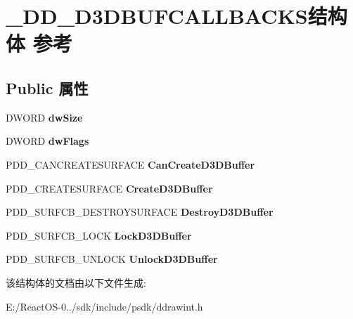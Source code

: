 \hypertarget{struct___d_d___d3_d_b_u_f_c_a_l_l_b_a_c_k_s}{}\section{\+\_\+\+D\+D\+\_\+\+D3\+D\+B\+U\+F\+C\+A\+L\+L\+B\+A\+C\+K\+S结构体 参考}
\label{struct___d_d___d3_d_b_u_f_c_a_l_l_b_a_c_k_s}
\subsection*{Public 属性}
\begin{DoxyCompactItemize}
\item 
\mbox{\label{struct___d_d___d3_d_b_u_f_c_a_l_l_b_a_c_k_s_a2216ba00adfc816fd899f154f5839d31}} 
D\+W\+O\+RD {\bfseries dw\+Size}
\item 
\mbox{\label{struct___d_d___d3_d_b_u_f_c_a_l_l_b_a_c_k_s_ab20cefdaa7492e17e8a6e7297d644f2c}} 
D\+W\+O\+RD {\bfseries dw\+Flags}
\item 
\mbox{\label{struct___d_d___d3_d_b_u_f_c_a_l_l_b_a_c_k_s_a35174bb3e5e3be44a9f57cf0bf78bafa}} 
P\+D\+D\+\_\+\+C\+A\+N\+C\+R\+E\+A\+T\+E\+S\+U\+R\+F\+A\+CE {\bfseries Can\+Create\+D3\+D\+Buffer}
\item 
\mbox{\label{struct___d_d___d3_d_b_u_f_c_a_l_l_b_a_c_k_s_a6c274355413b4c9b913be2210bee8316}} 
P\+D\+D\+\_\+\+C\+R\+E\+A\+T\+E\+S\+U\+R\+F\+A\+CE {\bfseries Create\+D3\+D\+Buffer}
\item 
\mbox{\label{struct___d_d___d3_d_b_u_f_c_a_l_l_b_a_c_k_s_a95b9239027a566708041f562d621815c}} 
P\+D\+D\+\_\+\+S\+U\+R\+F\+C\+B\+\_\+\+D\+E\+S\+T\+R\+O\+Y\+S\+U\+R\+F\+A\+CE {\bfseries Destroy\+D3\+D\+Buffer}
\item 
\mbox{\label{struct___d_d___d3_d_b_u_f_c_a_l_l_b_a_c_k_s_ad698438707d30a461d2548bb86634b6b}} 
P\+D\+D\+\_\+\+S\+U\+R\+F\+C\+B\+\_\+\+L\+O\+CK {\bfseries Lock\+D3\+D\+Buffer}
\item 
\mbox{\label{struct___d_d___d3_d_b_u_f_c_a_l_l_b_a_c_k_s_ae685e4727f62906b427f66c460e42531}} 
P\+D\+D\+\_\+\+S\+U\+R\+F\+C\+B\+\_\+\+U\+N\+L\+O\+CK {\bfseries Unlock\+D3\+D\+Buffer}
\end{DoxyCompactItemize}


该结构体的文档由以下文件生成\+:\begin{DoxyCompactItemize}
\item 
E\+:/\+React\+O\+S-\/0../sdk/include/psdk/ddrawint.\+h\end{DoxyCompactItemize}

